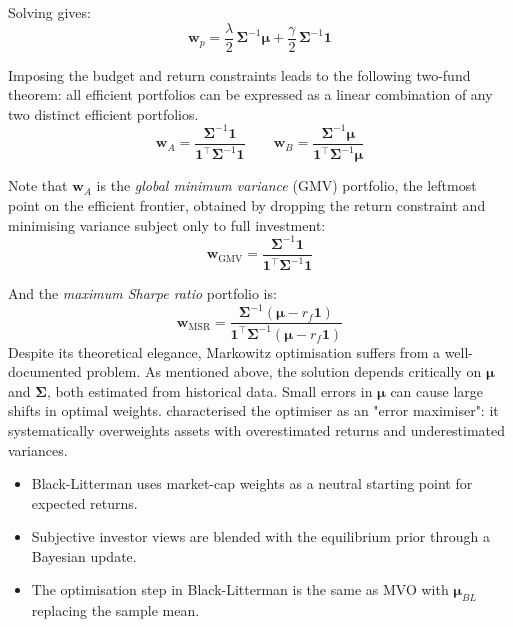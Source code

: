 \documentclass[a4paper,alpha-refs]{scr-contemporary}
\numberwithin{equation}{section}
\begin{document}
Solving gives:
\begin{equation}
  \mathbf{w}_p = \frac{\lambda}{2}\,\boldsymbol{\Sigma}^{-1}\boldsymbol{\mu} + \frac{\gamma}{2}\,\boldsymbol{\Sigma}^{-1}\mathbf{1}
\end{equation}

Imposing the budget and return constraints leads to the following two-fund theorem: all efficient portfolios can be expressed as a 
linear combination of any two distinct efficient portfolios.
\begin{equation}
  \mathbf{w}_A = \frac{\boldsymbol{\Sigma}^{-1}\mathbf{1}}{\mathbf{1}^\top \boldsymbol{\Sigma}^{-1}\mathbf{1}}
  \qquad
  \mathbf{w}_B = \frac{\boldsymbol{\Sigma}^{-1}\boldsymbol{\mu}}{\mathbf{1}^\top \boldsymbol{\Sigma}^{-1}\boldsymbol{\mu}}
\end{equation}

Note that $\mathbf{w}_A$ is the \emph{global minimum variance} (GMV) portfolio, 
the leftmost point on the efficient frontier, obtained by dropping the 
return constraint and minimising variance subject only to full investment:
\begin{equation}
  \mathbf{w}_{\mathrm{GMV}}
    = \frac{\boldsymbol{\Sigma}^{-1}\mathbf{1}}{\mathbf{1}^\top \boldsymbol{\Sigma}^{-1}\mathbf{1}}
\end{equation}

And the \emph{maximum Sharpe ratio} portfolio is:
\begin{equation}
  \mathbf{w}_{\mathrm{MSR}}
    = \frac{\boldsymbol{\Sigma}^{-1}(\boldsymbol{\mu} - r_f \mathbf{1})}
           {\mathbf{1}^\top \boldsymbol{\Sigma}^{-1}(\boldsymbol{\mu} - r_f \mathbf{1})}
  \label{eq:msr}
\end{equation}
\indent Despite its theoretical elegance, Markowitz optimisation suffers from a well-documented problem. 
As mentioned above, the solution depends critically on $\boldsymbol{\mu}$ and $\boldsymbol{\Sigma}$, both estimated from historical data. \newline
\indent Small errors in $\mathbf{\mu}$ can cause large shifts in optimal weights.
\citet{michaud_markowitz_1989} characterised the optimiser as an "error maximiser": it systematically overweights assets with 
overestimated returns and underestimated variances.

\begin{keypoints*}
\begin{itemize}
  \item Black-Litterman uses market-cap weights as a neutral 
  starting point for expected returns.
  \item Subjective investor views are blended with the equilibrium
  prior through a Bayesian update.
  \item The optimisation step in Black-Litterman is the same as MVO
  with $\boldsymbol{\mu}_{BL}$ replacing the sample mean.                                                    
\end{itemize}
\end{keypoints*}
\end{document}
